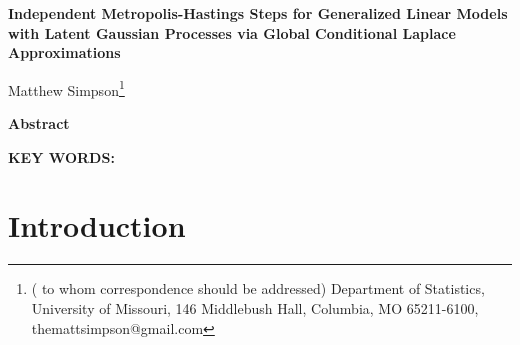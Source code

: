 \documentclass[12pt]{article}
\begin{document}
\thispagestyle{empty} \baselineskip=28pt

\begin{center}
{\LARGE{\bf Independent Metropolis-Hastings Steps for Generalized Linear Models with Latent Gaussian Processes via Global Conditional Laplace Approximations}}
\end{center}

\baselineskip=12pt
\vskip 2mm
\blind
{
  \begin{center}
    Matthew Simpson\footnote{(\baselineskip=10pt to whom correspondence should be addressed)
      Department of Statistics, University of Missouri,
      146 Middlebush Hall, Columbia, MO 65211-6100, themattsimpson@gmail.com}
  \end{center}
} \fi

\vskip 2mm
\begin{center}
{\large{\bf Abstract}}
\end{center}


\baselineskip=12pt

\baselineskip=12pt
\par\vfill\noindent
{\bf KEY WORDS:}

\par\medskip\noindent


\clearpage\pagebreak\newpage {}
\baselineskip=24pt

\section{Introduction}
\end{document}
